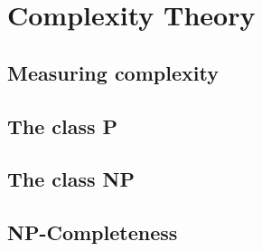 \documentclass[11pt]{article}
\theoremstyle{definition}
\begin{document}
\section{Complexity Theory}
\subsection{Measuring complexity}
\subsection{The class P}
\subsection{The class NP}
\subsection{NP-Completeness}
\end{document}
